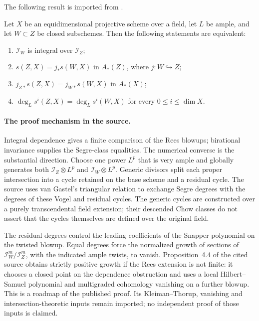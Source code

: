 The following result is imported from
\cite[Theorem~A, Theorem~4.3]{CidRuiz26SegrePublished}.
\begin{theorem}
\label{thm:appC-ample-Segre-dependence}
Let $X$ be an equidimensional projective scheme over a field,
let $L$ be ample, and let $W\subset Z$ be closed subschemes.
Then the following statements are equivalent:
\begin{enumerate}
\item $\mathcal I_W$ is integral over $\mathcal I_Z$;
\item $s(Z,X)=j_*s(W,X)$ in $A_*(Z)$, where
      $j:W\hookrightarrow Z$;
\item $j_{Z*}s(Z,X)=j_{W*}s(W,X)$ in $A_*(X)$;
\item $\deg_L s^i(Z,X)=\deg_L s^i(W,X)$ for every
      $0\leq i\leq\dim X$.
\end{enumerate}
\end{theorem}

\paragraph{The proof mechanism in the source.}
Integral dependence gives a finite comparison of the Rees blowups;
birational invariance supplies the Segre-class equalities. The
numerical converse is the substantial direction. Choose one power
$L^p$ that is very ample and globally generates both
$\mathcal I_Z\otimes L^p$ and $\mathcal I_W\otimes L^p$.
Generic divisors split each proper intersection into a cycle retained
on the base scheme and a residual cycle. The source uses van
Gastel's triangular relation to exchange Segre degrees with the
degrees of these Vogel and residual cycles. The generic cycles
are constructed over a purely transcendental field extension;
their descended Chow classes do not assert that the cycles
themselves are defined over the original field.

The residual degrees control the leading coefficients of the
Snapper polynomial on the twisted blowup. Equal degrees force
the normalized growth of sections of
$\mathcal I_W^m/\mathcal I_Z^m$, with the indicated ample twists,
to vanish. Proposition~4.4 of the cited source obtains strictly
positive growth if the Rees extension is not finite: it chooses
a closed point on the dependence obstruction and uses a local
Hilbert--Samuel polynomial and multigraded cohomology vanishing
on a further blowup. This is a roadmap of the published proof.
Its Kleiman--Thorup, vanishing and intersection-theoretic inputs
remain imported; no independent proof of those inputs is claimed.


